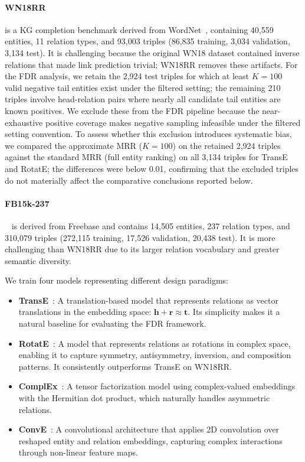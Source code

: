 \paragraph{WN18RR} is a KG completion benchmark derived from WordNet~\cite{dettmers2018convolutional}, containing 40,559 entities, 11 relation types, and 93,003 triples (86,835 training, 3,034 validation, 3,134 test). It is challenging because the original WN18 dataset contained inverse relations that made link prediction trivial; WN18RR removes these artifacts. For the FDR analysis, we retain the 2,924 test triples for which at least $K=100$ valid negative tail entities exist under the filtered setting; the remaining 210 triples involve head-relation pairs where nearly all candidate tail entities are known positives. We exclude these from the FDR pipeline because the near-exhaustive positive coverage makes negative sampling infeasible under the filtered setting convention. To assess whether this exclusion introduces systematic bias, we compared the approximate MRR ($K=100$) on the retained 2,924 triples against the standard MRR (full entity ranking) on all 3,134 triples for TransE and RotatE; the differences were below 0.01, confirming that the excluded triples do not materially affect the comparative conclusions reported below.

\paragraph{FB15k-237}~\cite{toutanova2015representing} is derived from Freebase and contains 14,505 entities, 237 relation types, and 310,079 triples (272,115 training, 17,526 validation, 20,438 test). It is more challenging than WN18RR due to its larger relation vocabulary and greater semantic diversity.

We train four models representing different design paradigms:
\begin{itemize}
    \item \textbf{TransE}~\cite{bordes2013translating}: A translation-based model that represents relations as vector translations in the embedding space: $\mathbf{h} + \mathbf{r} \approx \mathbf{t}$. Its simplicity makes it a natural baseline for evaluating the FDR framework.
    \item \textbf{RotatE}~\cite{sun2019rotate}: A model that represents relations as rotations in complex space, enabling it to capture symmetry, antisymmetry, inversion, and composition patterns. It consistently outperforms TransE on WN18RR.
    \item \textbf{ComplEx}~\cite{trouillon2016complex}: A tensor factorization model using complex-valued embeddings with the Hermitian dot product, which naturally handles asymmetric relations.
    \item \textbf{ConvE}~\cite{dettmers2018convolutional}: A convolutional architecture that applies 2D convolution over reshaped entity and relation embeddings, capturing complex interactions through non-linear feature maps.
\end{itemize}

